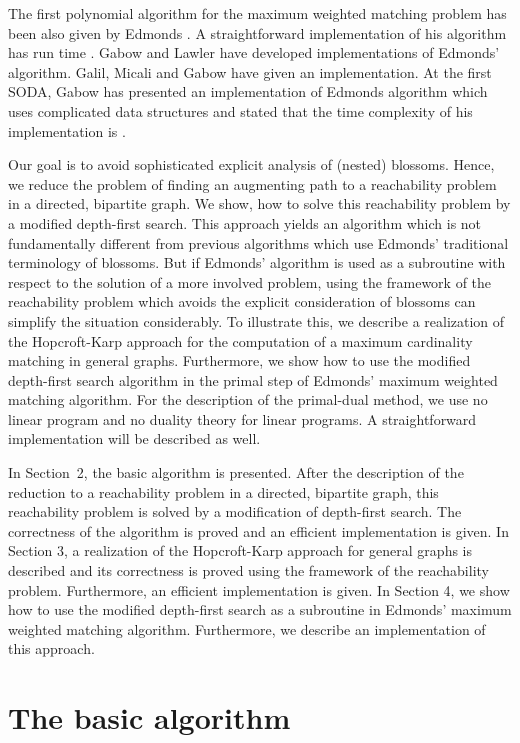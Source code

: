 \documentclass[12pt,twoside,a4paper]{article}
\begin{document}
The first polynomial algorithm for the maximum weighted matching problem has been also 
given by Edmonds \cite{Ed2}. A straightforward implementation of his algorithm has run 
time . Gabow \cite{Ga1} and Lawler \cite{La} have developed  
implementations of Edmonds' algorithm. Galil, Micali and Gabow \cite{GaMiGa} have given 
an  implementation. At the first SODA, Gabow \cite{Ga2} has
presented an implementation of Edmonds algorithm which uses complicated data structures
and stated that the time complexity of his implementation is . 

Our goal is to avoid sophisticated explicit analysis of (nested) blossoms.
Hence, we reduce the problem of finding an augmenting path to a reachability 
problem in a directed, bipartite graph. We show, how to solve this reachability 
problem by a modified depth-first search. This approach yields an algorithm which is not
fundamentally different from previous algorithms which use Edmonds' traditional
terminology of blossoms. But if Edmonds' algorithm is used as a subroutine with respect
to the solution of a more involved problem, using the framework of the reachability
problem which avoids the explicit consideration of blossoms can simplify the situation 
considerably. To illustrate this, we describe a realization of the Hopcroft-Karp approach 
\cite{HK} for the 
computation of a maximum cardinality matching in general graphs. Furthermore, we show how 
to use the modified depth-first search algorithm in the primal step of Edmonds' maximum 
weighted matching algorithm. For the description of the primal-dual method, we use no 
linear program and no duality theory for linear programs. 
A straightforward  implementation will be described as well.

In Section~2, the basic algorithm is presented. After the description of
the reduction to a reachability problem in a directed, bipartite graph, this 
reachability problem is solved by a modification of depth-first search.
The correctness of the algorithm is proved and an efficient implementation
is given. In Section 3, a realization of the Hopcroft-Karp approach for general graphs
is described and its correctness is proved using the framework of the reachability 
problem. Furthermore, an efficient implementation is given.
In Section 4, we show how to use the modified depth-first search as a subroutine in Edmonds' 
maximum weighted matching algorithm. Furthermore, we describe an 
implementation of this approach.

\section{The basic algorithm}
\end{document}
